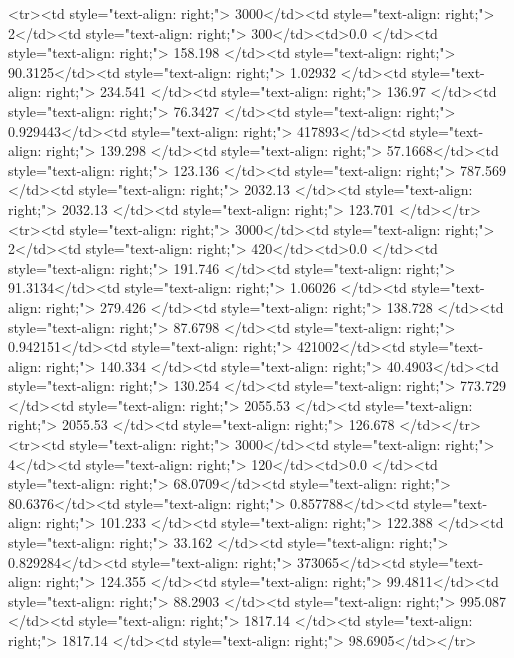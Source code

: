 <tr><td style="text-align: right;">      3000</td><td style="text-align: right;">         2</td><td style="text-align: right;">           300</td><td>0.0          </td><td style="text-align: right;">               158.198 </td><td style="text-align: right;">            90.3125</td><td style="text-align: right;">         1.02932 </td><td style="text-align: right;">        234.541 </td><td style="text-align: right;">           136.97  </td><td style="text-align: right;">              76.3427  </td><td style="text-align: right;">             0.929443</td><td style="text-align: right;">              417893</td><td style="text-align: right;">                      139.298 </td><td style="text-align: right;">            57.1668</td><td style="text-align: right;">               123.136  </td><td style="text-align: right;">       787.569 </td><td style="text-align: right;">   2032.13 </td><td style="text-align: right;">      2032.13 </td><td style="text-align: right;">                123.701 </td></tr>
<tr><td style="text-align: right;">      3000</td><td style="text-align: right;">         2</td><td style="text-align: right;">           420</td><td>0.0          </td><td style="text-align: right;">               191.746 </td><td style="text-align: right;">            91.3134</td><td style="text-align: right;">         1.06026 </td><td style="text-align: right;">        279.426 </td><td style="text-align: right;">           138.728 </td><td style="text-align: right;">              87.6798  </td><td style="text-align: right;">             0.942151</td><td style="text-align: right;">              421002</td><td style="text-align: right;">                      140.334 </td><td style="text-align: right;">            40.4903</td><td style="text-align: right;">               130.254  </td><td style="text-align: right;">       773.729 </td><td style="text-align: right;">   2055.53 </td><td style="text-align: right;">      2055.53 </td><td style="text-align: right;">                126.678 </td></tr>
<tr><td style="text-align: right;">      3000</td><td style="text-align: right;">         4</td><td style="text-align: right;">           120</td><td>0.0          </td><td style="text-align: right;">                68.0709</td><td style="text-align: right;">            80.6376</td><td style="text-align: right;">         0.857788</td><td style="text-align: right;">        101.233 </td><td style="text-align: right;">           122.388 </td><td style="text-align: right;">              33.162   </td><td style="text-align: right;">             0.829284</td><td style="text-align: right;">              373065</td><td style="text-align: right;">                      124.355 </td><td style="text-align: right;">            99.4811</td><td style="text-align: right;">                88.2903 </td><td style="text-align: right;">       995.087 </td><td style="text-align: right;">   1817.14 </td><td style="text-align: right;">      1817.14 </td><td style="text-align: right;">                 98.6905</td></tr>
